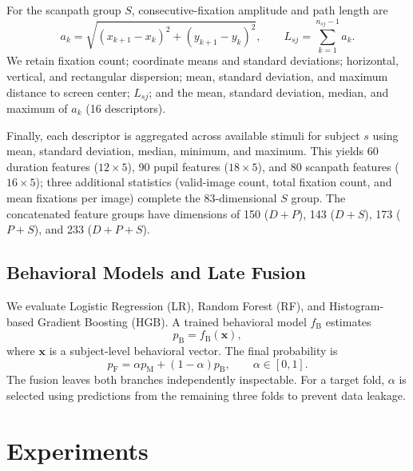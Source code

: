 \documentclass[conference,a4paper]{IEEEtran}
\begin{document}
For the scanpath group $S$, consecutive-fixation amplitude and path length are
\begin{equation}
a_k=\sqrt{(x_{k+1}-x_k)^2+(y_{k+1}-y_k)^2},\qquad L_{sj}=\sum_{k=1}^{n_{sj}-1}a_k.
\label{eq:scanpath}
\end{equation}
We retain fixation count; coordinate means and standard deviations; horizontal, vertical, and rectangular dispersion; mean, standard deviation, and maximum distance to screen center; $L_{sj}$; and the mean, standard deviation, median, and maximum of $a_k$ (16 descriptors).

Finally, each descriptor is aggregated across available stimuli for subject $s$ using mean, standard deviation, median, minimum, and maximum. This yields 60 duration features ($12\times5$), 90 pupil features ($18\times5$), and 80 scanpath features ($16\times5$); three additional statistics (valid-image count, total fixation count, and mean fixations per image) complete the 83-dimensional $S$ group. The concatenated feature groups have dimensions of 150 ($D+P$), 143 ($D+S$), 173 ($P+S$), and 233 ($D+P+S$).

\subsection{Behavioral Models and Late Fusion}
We evaluate Logistic Regression (LR), Random Forest (RF), and Histogram-based Gradient Boosting (HGB). A trained behavioral model $f_{\mathrm{B}}$ estimates
\begin{equation}
p_{\mathrm{B}}=f_{\mathrm{B}}(\mathbf{x}),
\end{equation}
where $\mathbf{x}$ is a subject-level behavioral vector. The final probability is
\begin{equation}
p_{\mathrm{F}}=\alpha p_{\mathrm{M}}+(1-\alpha)p_{\mathrm{B}},\qquad \alpha\in[0,1].
\label{eq:fusion}
\end{equation}
The fusion leaves both branches independently inspectable. For a target fold, $\alpha$ is selected using predictions from the remaining three folds to prevent data leakage.

\section{Experiments}
\end{document}
